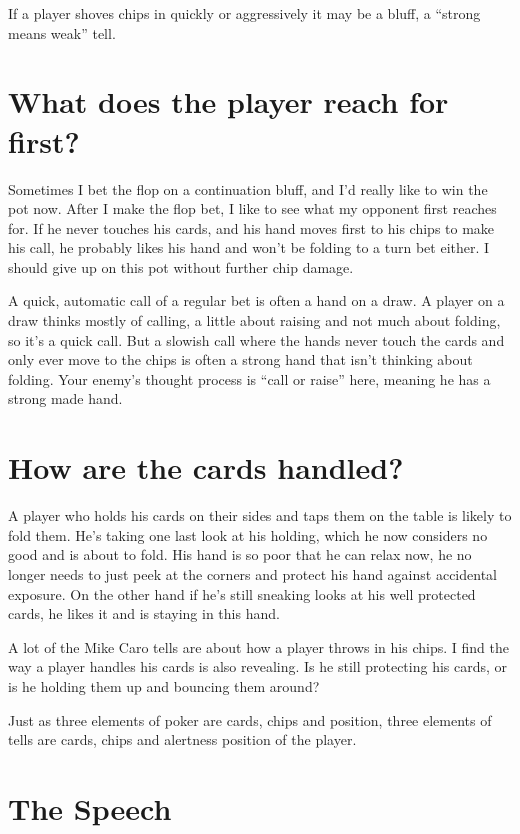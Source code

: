 If a player shoves chips in quickly or aggressively it may be a bluff,
a ``strong means weak'' tell.

\section{What does the player reach for first?}

Sometimes I bet the flop on a continuation bluff, and I'd really like
to win the pot now. After I make the flop bet, I like to see what
my opponent first reaches for. If he never touches his cards, and his
hand moves first to his chips to make his call, he probably likes his
hand and won't be folding to a turn bet either. I should
give up on this pot without further chip damage.

A quick, automatic call of a regular bet is often a hand on a
draw. A player on a draw thinks mostly of calling, a little about raising
and not much about folding, so it's a quick call. But a slowish call
where the hands never touch the cards and only ever move to the chips
is often a strong hand that isn't thinking about folding. Your enemy's
thought process is ``call or raise'' here, meaning he has a strong
made hand.

\section{How are the cards handled?}

A player who holds his cards on their sides and taps them on
the table is likely to fold them. He's taking one last look
at his holding, which he now considers no good and is about
to fold. His hand is so poor that he can relax now, he no longer
needs to just peek at the corners and protect his hand against
accidental exposure. On the other hand if he's still sneaking looks at
his well protected cards, he likes it and is staying in this hand.

A lot of the Mike Caro tells are about how a player
throws in his chips. I find the way a player
handles his cards is also revealing. Is he still protecting
his cards, or is he holding them up and bouncing them around?

Just as three elements of poker are cards, chips and position,
three elements of tells are cards, chips and alertness position
of the player.

\section{The Speech}

